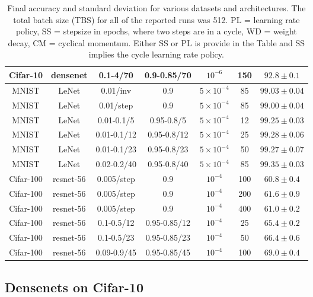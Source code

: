 \documentclass{article} %
\begin{document}
\begin{table}[tb]
\begin{center}
\begin{tabular}{| c | c | c | c | c | c | c | }
			Cifar-10 & densenet & 0.1-4/70  & 0.9-0.85/70 & $10^{-6}$  &  150 & $ 92.8 \pm 0.1 $   \\ \hline
			\hline   
			MNIST  & LeNet & 0.01/inv & 0.9  & $5 \times 10^{-4}$  &  85 & $ 99.03 \pm 0.04 $   \\ \hline
			MNIST  & LeNet & 0.01/step  & 0.9  & $5 \times 10^{-4}$  &  85 & $ 99.00 \pm 0.04 $   \\ \hline
			MNIST  & LeNet & 0.01-0.1/5  & 0.95-0.8/5 & $5 \times 10^{-4}$  &  12 & $ 99.25  \pm 0.03 $   \\ \hline
			MNIST  & LeNet & 0.01-0.1/12  & 0.95-0.8/12 & $5 \times 10^{-4}$  &  25 & $ 99.28  \pm 0.06 $   \\ \hline
			MNIST  & LeNet & 0.01-0.1/23  & 0.95-0.8/23 & $5 \times 10^{-4}$  &  50 & $ 99.27  \pm 0.07 $   \\ \hline
			MNIST  & LeNet & 0.02-0.2/40  & 0.95-0.8/40 & $5 \times 10^{-4}$  &  85 & $ 99.35  \pm 0.03 $   \\ \hline
			\hline   
			Cifar-100 & resnet-56 & 0.005/step & 0.9  & $10^{-4}$  &  100 & $ 60.8 \pm 0.4 $   \\ \hline
			Cifar-100 & resnet-56 & 0.005/step & 0.9  & $10^{-4}$  &  200 & $ 61.6 \pm 0.9 $   \\ \hline
			Cifar-100 & resnet-56 & 0.005/step & 0.9  & $10^{-4}$  &  400 & $ 61.0 \pm 0.2 $   \\ \hline
			Cifar-100 & resnet-56 & 0.1-0.5/12 & 0.95-0.85/12 & $10^{-4}$  &  25 & $ 65.4 \pm 0.2 $   \\ \hline
			Cifar-100 & resnet-56 & 0.1-0.5/23 & 0.95-0.85/23 & $10^{-4}$  &  50 & $ 66.4 \pm 0.6 $   \\ \hline
			Cifar-100 & resnet-56 & 0.09-0.9/45 & 0.95-0.85/45 & $10^{-4}$  &  100 & $ 69.0 \pm 0.4 $   \\ \hline
		\end{tabular}
		\vspace{10pt}
		\caption{Final accuracy and standard deviation for various datasets and architectures.  The total batch size (TBS) for all of the reported runs was 512.  PL = learning rate policy, SS = stepsize in epochs, where two steps are in a cycle, WD = weight decay, CM = cyclical momentum. Either SS or PL is provide in the Table and SS implies the cycle learning rate policy. }
		\label{tab:otherExamples}
	\end{center}
	\vspace{-20pt}
\end{table}

\subsection{Densenets on Cifar-10}
\label{sec:dense}
\end{document}
